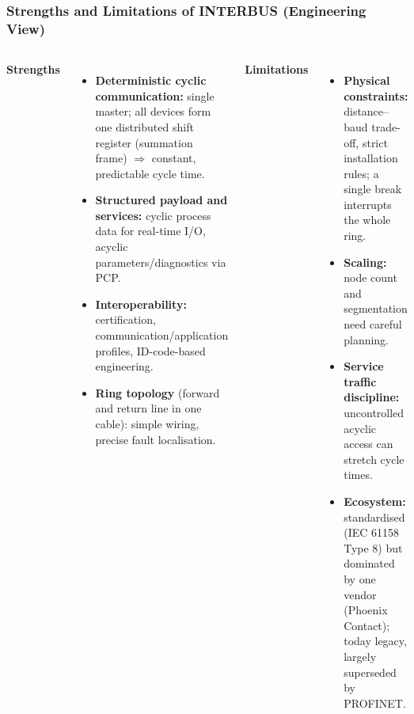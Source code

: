 \begin{frame}
	\frametitle{Strengths and Limitations of INTERBUS (Engineering View)}
	\small
	\begin{columns}[T,onlytextwidth]
		\textbf{Strengths}
		\begin{itemize}
			\item \textbf{Deterministic cyclic communication:} single master; all devices form one distributed shift register (summation frame) $\Rightarrow$ constant, predictable cycle time.
			\item \textbf{Structured payload and services:} cyclic process data for real-time I/O, acyclic parameters/diagnostics via PCP.
			\item \textbf{Interoperability:} certification, communication/application profiles, ID-code-based engineering.
			\item \textbf{Ring topology} (forward and return line in one cable): simple wiring, precise fault localisation.
		\end{itemize}
		\textbf{Limitations}
		\begin{itemize}
			\item \textbf{Physical constraints:} distance--baud trade-off, strict installation rules; a single break interrupts the whole ring.
			\item \textbf{Scaling:} node count and segmentation need careful planning.
			\item \textbf{Service traffic discipline:} uncontrolled acyclic access can stretch cycle times.
			\item \textbf{Ecosystem:} standardised (IEC 61158 Type 8) but dominated by one vendor (Phoenix Contact); today legacy, largely superseded by PROFINET.
		\end{itemize}
	\end{columns}
\end{frame}
